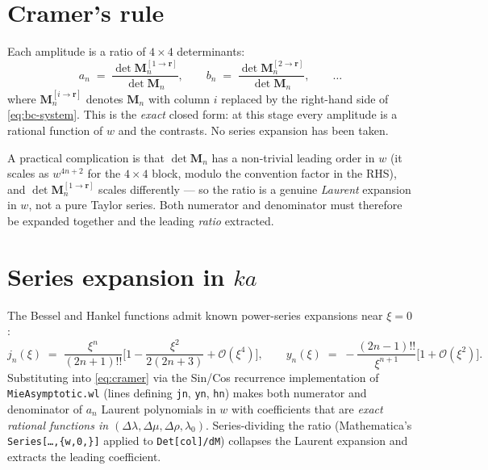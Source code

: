 \documentclass[11pt,a4paper]{article}
\newcommand{\D}{\Delta}
\newcommand{\order}{\mathcal{O}}
\newcommand{\code}[1]{\texttt{#1}}
\newcommand{\bM}{\mathbf{M}}
\begin{document}
\section{Cramer's rule}
\label{sec:cramer}

Each amplitude is a ratio of $4\times 4$ determinants:
\begin{equation}
a_n \;=\; \frac{\det \bM_n^{[1\to\mathbf{r}]}}{\det \bM_n},
\qquad
b_n \;=\; \frac{\det \bM_n^{[2\to\mathbf{r}]}}{\det \bM_n},
\qquad \dots
\label{eq:cramer}
\end{equation}
where $\bM_n^{[i\to\mathbf{r}]}$ denotes $\bM_n$ with column $i$
replaced by the right-hand side of \eqref{eq:bc-system}.  This is the
\emph{exact} closed form: at this stage every amplitude is a rational
function of $w$ and the contrasts.  No series expansion has been taken.

A practical complication is that $\det\bM_n$ has a non-trivial leading
order in $w$ (it scales as $w^{4n+2}$ for the $4\times 4$ block, modulo
the convention factor in the RHS), and $\det\bM_n^{[1\to\mathbf{r}]}$
scales differently --- so the ratio is a genuine \emph{Laurent}
expansion in $w$, not a pure Taylor series.  Both numerator and
denominator must therefore be expanded together and the leading
\emph{ratio} extracted.

\section{Series expansion in $ka$}
\label{sec:series}

The Bessel and Hankel functions admit known power-series expansions
near $\xi=0$:
\begin{equation}
j_n(\xi) \;=\; \frac{\xi^n}{(2n+1)!!}\biggl[1-\frac{\xi^2}{2(2n+3)}+\order(\xi^4)\biggr],
\qquad
y_n(\xi) \;=\; -\frac{(2n-1)!!}{\xi^{n+1}}\bigl[1+\order(\xi^2)\bigr].
\label{eq:bessel-series}
\end{equation}
Substituting into \eqref{eq:cramer} via the Sin/Cos recurrence
implementation of \code{MieAsymptotic.wl} (lines defining
\code{jn}, \code{yn}, \code{hn}) makes both numerator and denominator
of $a_n$ Laurent polynomials in $w$ with coefficients that are
\emph{exact rational functions in $(\D\lambda,\D\mu,\D\rho,\lambda_0)$}.
Series-dividing the ratio (Mathematica's \code{Series[\dots,\{w,0,\}]}
applied to \code{Det[col]/dM}) collapses the Laurent expansion and
extracts the leading coefficient.
\end{document}
